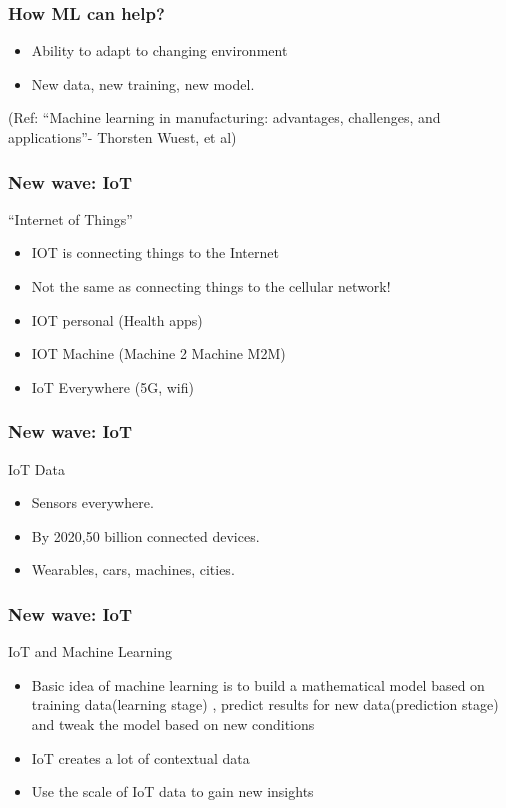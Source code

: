 \begin{frame}[fragile]\frametitle{How ML can help?}

\begin{itemize}
\item  Ability to adapt to changing environment
\item New data, new training, new model.
\end{itemize}
{\tiny (Ref: ``Machine learning in manufacturing: advantages, challenges, and applications''- Thorsten Wuest, et al)}
\end{frame}

\begin{frame}[fragile]\frametitle{New wave: IoT}
``Internet of Things''
\begin{itemize}
\item  IOT is connecting things to the Internet
\item Not the same as connecting things to the cellular network! 
\item IOT personal (Health apps) 
\item IOT Machine (Machine 2 Machine M2M) 
\item IoT Everywhere (5G, wifi)
\end{itemize}
\end{frame}

\begin{frame}[fragile]\frametitle{New wave: IoT}
IoT Data
\begin{itemize}
\item Sensors everywhere.
\item By 2020,50 billion connected devices.
\item Wearables, cars, machines, cities.
\end{itemize}
\end{frame}

\begin{frame}[fragile]\frametitle{New wave: IoT}
IoT and Machine Learning
\begin{itemize}
\item Basic idea of machine learning is to build a mathematical model based on training data(learning stage) ,  predict results for new data(prediction stage) and tweak the model based on new conditions
\item  IoT creates a lot of contextual data 
\item Use the scale of IoT data to gain new insights
\end{itemize}
\end{frame}

